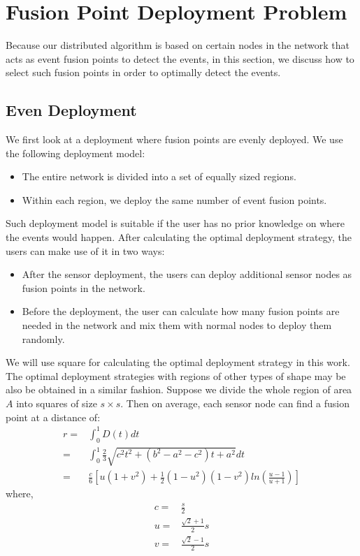 \section{Fusion Point Deployment Problem}
Because our distributed algorithm is based on certain nodes in the network that acts as event fusion points to detect the events, in this section, we discuss how to select such fusion points in order to optimally detect the events.
\subsection{Even Deployment}
We first look at a deployment where fusion points are evenly deployed. We use the following deployment model:
\begin{itemize}
\item The entire network is divided into a set of equally sized regions.
\item Within each region, we deploy the same number of event fusion points. 
\end{itemize}

Such deployment model is suitable if the user has no prior knowledge on where the events would happen. After calculating the optimal deployment strategy, the users can make use of it in two ways:
\begin{itemize}
\item After the sensor deployment, the users can deploy additional sensor nodes as fusion points in the network.
\item Before the deployment, the user can calculate how many fusion points are needed in the network and mix them with normal nodes to deploy them randomly.
\end{itemize}
We will use square for calculating the optimal deployment strategy in this work. The optimal deployment strategies with regions of other types of shape may be also be obtained in a similar fashion. Suppose we divide the whole region of area \(A\) into squares of size \(s\times s\). Then on average, each sensor node can find a fusion point at a distance of:
\begin{align}
r=&\int_0^1D(t)dt\nonumber\\
=&\int_0^1\frac{2}{3}\sqrt{c^2t^2+(b^2-a^2-c^2)t+a^2}dt\nonumber\\
=&\frac{c}{6}[u(1+v^2)+\frac{1}{2}(1-u^2)(1-v^2)ln(\frac{u-1}{u+1})]\label{eq:avgdist1}
\end{align}
where,
\begin{align}
c=&\frac{s}{2}\nonumber\\
u=&\frac{\sqrt{2}+1}{2}s\nonumber\\
v=&\frac{\sqrt{2}-1}{2}s\label{eq:avgdist2}
\end{align}

